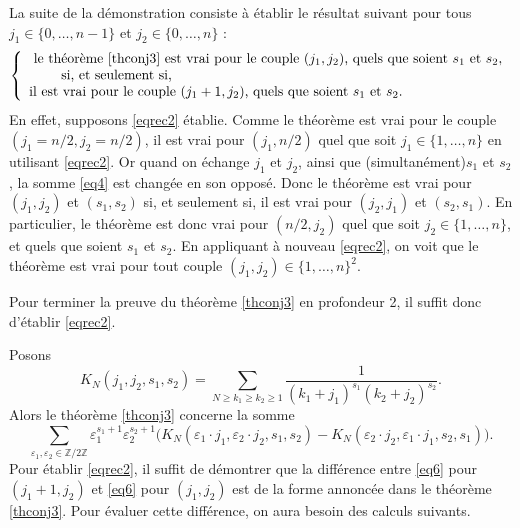 \documentclass[12pt,francais, reqno]{smfart}
\numberwithin{equation}{section}
\newcommand{\Z}{\mathbb Z}
\newcommand{\zdz}{\Z / 2 \Z}
\newcommand{\eps}{\varepsilon}
\newcommand{\zeron}{\{0,\ldots, n\}}
\newcommand{\zeronmu}{\{0,\ldots, n-1\}}
\newcommand{\unn}{\{1,\ldots, n\}}
\begin{document}
\bigskip
 
 La suite de la d\'emonstration consiste \`a \'etablir le r\'esultat suivant pour tous $j_1  \in \zeronmu$ et $j_2 \in \zeron$  :
\begin{equation}  \label{eqrec2}
\left\{
\begin{array}{l}
\mbox{ le th\'eor\`eme \ref{thconj3}   est vrai pour le couple $(j_1, j_2)$, quels que soient  $s_1$ et $ s_2$}, \\
\quad \quad \mbox{ si, et seulement si, }\\
\mbox{il  est vrai pour le couple $(j_1+1, j_2)$, quels que soient  $s_1$ et $ s_2$}.
\end{array}
\right.
\end{equation}
En effet, supposons \eqref{eqrec2} \'etablie. Comme  le th\'eor\`eme  est vrai pour le couple $(j_1 = n/2, j_2 = n/2)$, il est vrai pour $(j_1, n/2)$ quel que soit $j_1 \in \unn$ en utilisant \eqref{eqrec2}. Or quand on \'echange $j_1$ et $j_2$, ainsi que (simultan\'ement)$s_1$ et $s_2$, la somme \eqref{eq4} est chang\'ee en son oppos\'e. Donc  le th\'eor\`eme  est vrai pour $(j_1, j_2)$ et $(s_1, s_2)$ si, et seulement si, il est vrai pour $(j_2, j_1)$ et $(s_2, s_1)$. En particulier,  le th\'eor\`eme  est donc vrai 
pour $(n/2, j_2)$ quel que soit $j_2 \in \unn$, et quels que soient $s_1$ et $s_2$. En appliquant \`a nouveau \eqref{eqrec2}, on voit que  le th\'eor\`eme  est vrai pour tout couple $(j_1, j_2) \in \unn ^2$.

Pour terminer la preuve du th\'eor\`eme \ref{thconj3}   en profondeur 2, il suffit donc d'\'etablir \eqref{eqrec2}. 

\bigskip

Posons 
$$K_N(j_1, j_2, s_1, s_2) = \sum_{N \geq k_1 \geq k_2 \geq 1}  \frac{1}{(k_1+j_1)^{s_1} (k_2+j_2)^{s_2}}.$$
Alors le th\'eor\`eme \ref{thconj3} concerne la somme
\begin{equation} \label{eq6}
\sum_{\eps_1, \eps_2 \in \zdz} \eps_1 ^{s_1+1}  \eps_2 ^{s_2+1} 
\Big( K_N(\eps_1 \cdot j_1, \eps_2 \cdot  j_2, s_1, s_2) -
K_N(\eps_2 \cdot j_2, \eps_1 \cdot  j_1, s_2, s_1)  \Big) .
\end{equation}
Pour \'etablir \eqref{eqrec2}, il suffit de d\'emontrer que la diff\'erence entre \eqref{eq6} pour $(j_1+1, j_2)$ et  \eqref{eq6} pour $(j_1, j_2)$ est de la forme annonc\'ee dans le th\'eor\`eme \ref{thconj3}. Pour \'evaluer cette diff\'erence, on aura besoin des calculs suivants.
\end{document}
